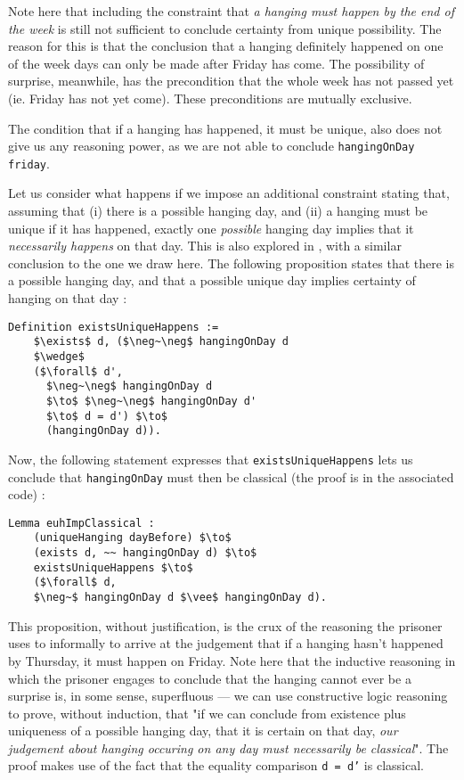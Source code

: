 \documentclass[journal]{journal}
\begin{document}
Note here that including the constraint that \emph{a hanging must happen
by the end of the week} is still not sufficient to conclude certainty
from unique possibility. The reason for this is that the conclusion that
a hanging definitely happened on one of the week days can only be made
after Friday has come. The possibility of surprise, meanwhile, has the
precondition that the whole week has not passed yet (ie. Friday has not yet come).
These preconditions are mutually exclusive.

The condition that if a hanging has happened, it must be unique, also does not
give us any reasoning power, as we are not able to conclude {\tt hangingOnDay friday}.

Let us consider what happens if we impose an additional constraint stating that, assuming that
(i) there is a possible hanging day, and (ii) a hanging must be unique if it has
happened, exactly one \emph{possible} hanging
day implies that it \emph{necessarily happens} on that day. This is also explored in
\cite{}, with a similar conclusion to the one we draw here. The following
proposition states that there is a possible hanging day, and that a possible
unique day implies certainty of hanging on that day :

\begin{lstlisting}[mathescape=true]
  Definition existsUniqueHappens :=
    $\exists$ d, ($\neg~\neg$ hangingOnDay d
    $\wedge$
    ($\forall$ d',
      $\neg~\neg$ hangingOnDay d
      $\to$ $\neg~\neg$ hangingOnDay d'
      $\to$ d = d') $\to$
      (hangingOnDay d)).
\end{lstlisting}

Now, the following statement expresses that {\tt existsUniqueHappens} lets us
conclude that {\tt hangingOnDay} must then be classical (the proof is in the
associated code) :

\begin{lstlisting}[mathescape=true]
  Lemma euhImpClassical :
    (uniqueHanging dayBefore) $\to$
    (exists d, ~~ hangingOnDay d) $\to$
    existsUniqueHappens $\to$
    ($\forall$ d,
    $\neg~$ hangingOnDay d $\vee$ hangingOnDay d).
\end{lstlisting}

This proposition, without justification, is the crux of the reasoning the prisoner
uses to informally to arrive at the judgement that
if a hanging hasn't happened by Thursday, it must happen on Friday.
Note here that the inductive reasoning in which the prisoner engages to conclude that the
hanging cannot ever be a surprise is, in some sense, superfluous --- we can use
constructive logic reasoning to prove, without induction, that "if we can conclude
from existence plus uniqueness of a possible hanging day, that it is certain on that day,
\emph{our judgement about hanging occuring on any day must necessarily be classical}".
The proof makes use of the fact that the equality comparison {\tt d = d'} is
classical.
\end{document}
